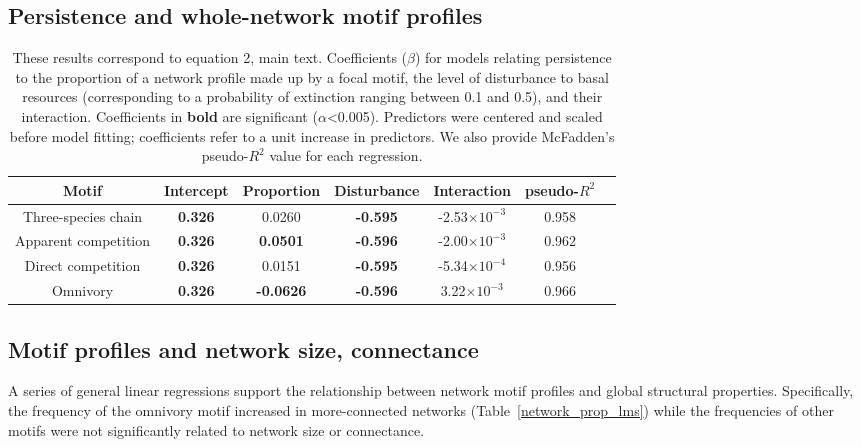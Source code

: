 \documentclass[12pt]{article}
\begin{document}
\begin{spacing}{2.0}
    \subsection{Persistence and whole-network motif profiles}


    \begin{table}[ht!]
        \caption{These results correspond to equation 2, main text. Coefficients ($\beta$) for models relating persistence to the proportion of a network profile made up by a focal motif, the level of disturbance to basal resources (corresponding to a probability of extinction ranging between 0.1 and 0.5), and their interaction. Coefficients in \textbf{bold} are significant ($\alpha$\textless0.005). Predictors were centered and scaled before model fitting; coefficients refer to a unit increase in predictors. We also provide McFadden's pseudo-$R^2$ value for each regression. }
        \label{motif_profile_tab}
        \centering
        \footnotesize
        \begin{tabular}{c|c c c c c | c }
        Motif & Intercept & Proportion & Disturbance & Interaction &  pseudo-$R^2$ \\
            \hline
            Three-species chain & \textbf{0.326} &  0.0260 & \textbf{-0.595} & -2.53$\times10^{-3}$ & 0.958 \\
            Apparent competition & \textbf{0.326} & \textbf{0.0501} & \textbf{-0.596} & -2.00$\times10^{-3}$ & 0.962 \\
            Direct competition & \textbf{0.326} & 0.0151 & \textbf{-0.595} & -5.34$\times10^{-4}$ & 0.956 \\
            Omnivory & \textbf{0.326} & \textbf{-0.0626} & \textbf{-0.596} & 3.22$\times10^{-3}$ & 0.966 \\
        \end{tabular}
    \end{table}

    \subsection{Motif profiles and network size, connectance}
    
        A series of general linear regressions support the relationship between network motif profiles and global structural properties.
        Specifically, the frequency of the omnivory motif increased in more-connected networks (Table~\ref{network_prop_lms}) while the frequencies of other motifs were not significantly related to network size or connectance.
    

\end{spacing}
\end{document}
